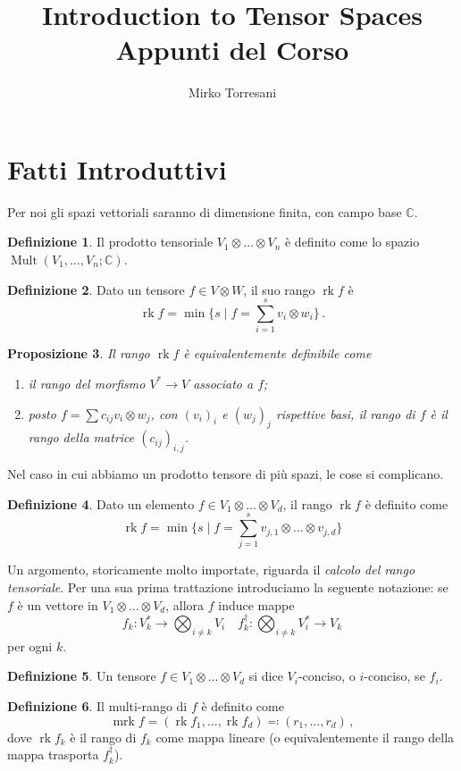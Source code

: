 \documentclass[a4paper, 11pt]{article}
\title{Introduction to Tensor Spaces\\ Appunti del Corso}
\author{Mirko Torresani}
\theoremstyle{definition}
\newtheorem{Def}{Definizione}[section]
\theoremstyle{plain}
\newtheorem{Prop}[Def]{Proposizione}
\newcommand{\C}{\mathbb{C}}
\DeclareMathOperator{\Mult}{Mult}
\DeclareMathOperator{\rk}{rk}
\DeclareMathOperator{\mrk}{mrk}
\begin{document}
	\maketitle
\section{Fatti Introduttivi}
Per noi gli spazi vettoriali saranno di dimensione finita, con campo base $\C$. 
\begin{Def}
	Il prodotto tensoriale $V_1 \otimes \dots \otimes V_n$ è definito come lo spazio $\Mult(V_1, \dots, V_n;\C)$.
\end{Def}

\begin{Def}
	Dato un tensore $f \in V \otimes W$, il suo rango $\rk f$ è 
	\[
		\rk f = \min\{s \mid f = \sum_{i = 1}^s v_i \otimes w_i\}\,.
	\]
\end{Def}
\begin{Prop}
	Il rango $\rk f$ è equivalentemente definibile come
	\begin{enumerate}
		\item il rango del morfismo $V^* \to V$ associato a $f$;
		\item posto $f = \sum c_{ij} v_i \otimes w_j$, con $(v_i)_i$ e $(w_j)_j$ rispettive basi, il rango di $f$ è il rango della matrice $(c_{ij})_{i,j}$.
	\end{enumerate}
\end{Prop}

Nel caso in cui abbiamo un prodotto tensore di più spazi, le cose si complicano.
\begin{Def}
	Dato un elemento $f \in V_1\otimes \dots\otimes V_d$, il rango $\rk f$ è definito come
	\[
		\rk f = \min\{s \mid f = \sum_{j = 1}^s v_{j,1} \otimes \dots \otimes  v_{j,d}\}
	\]
\end{Def}

Un argomento, storicamente molto importate, riguarda il \emph{calcolo del rango tensoriale}. Per una sua prima trattazione introduciamo la seguente notazione: se $f$ è un vettore in $V_1 \otimes \dots \otimes V_d$, allora $f$ induce mappe 
\[
	f_k \colon V_k^\ast \to \bigotimes_{i \neq k} V_i \quad f_k^\dagger \colon \bigotimes_{i \neq k} V_i^* \to V_k
\]
per ogni $k$.
\begin{Def}
	Un tensore $f \in V_1 \otimes \dots \otimes V_d$ si dice $V_i$-conciso, o $i$-conciso, se $f_i$.
\end{Def}
\begin{Def}
	Il multi-rango di $f$ è definito come
	\[
		\mrk f = (\rk f_1, \dots, \rk f_d) \eqqcolon (r_1, \dots, r_d) \,,
	\]
	dove $\rk f_k$ è il rango di $f_k$ come mappa lineare (o equivalentemente il rango della mappa trasporta $f_k^\dagger$).
\end{Def}
\end{document}
